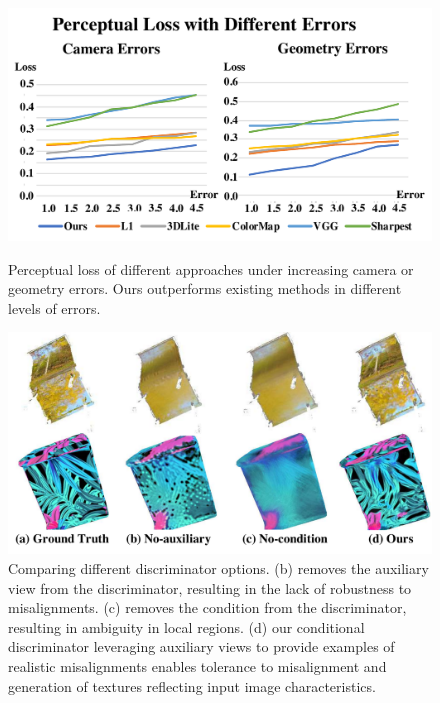 \begin{figure}
\begin{minipage}{0.49\linewidth}
    \label{fig:toptim-pose-visual}
\end{minipage}
\begin{minipage}{0.49\linewidth}
\begin{minipage}{\linewidth}
    \centering
    \includegraphics[width=0.9\linewidth]{texturegen/figures/chart.pdf}
    \caption{Perceptual loss of different approaches under increasing camera or geometry errors. Ours outperforms existing methods in different levels of errors.}
    \label{fig:toptim-pose-chart}
\end{minipage}
\begin{minipage}{\linewidth}
    \centering
    \includegraphics[width=\linewidth]{texturegen/figures/adversarial-compare.pdf}
    \caption{Comparing different discriminator options. (b) removes the auxiliary view from the discriminator, resulting in the lack of robustness to misalignments. (c) removes the condition from the discriminator, resulting in ambiguity in local regions. (d) our conditional discriminator leveraging auxiliary views to provide examples of realistic misalignments enables tolerance to misalignment and generation of textures reflecting input image characteristics. }
    \label{fig:toptim-gan-err}
\end{minipage}
\end{minipage}
\end{figure}

